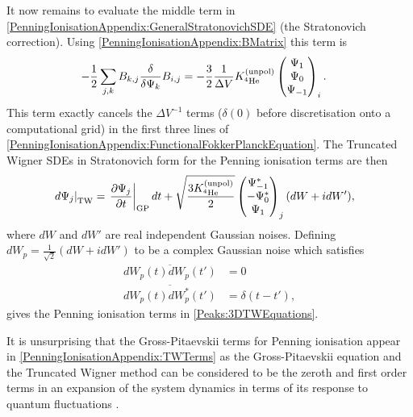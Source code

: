 It now remains to evaluate the middle term in \eqref{PenningIonisationAppendix:GeneralStratonovichSDE} (the Stratonovich correction). Using \eqref{PenningIonisationAppendix:BMatrix} this term is
\begin{align}
    - \frac{1}{2} \sum_{j, k} B_{k, j} \frac{\delta }{\delta \Psi_k}B_{i,j} &= - \frac{3}{2} \frac{1}{\Delta V} K^\text{(unpol)}_{^4\text{He}} 
    \begin{pmatrix}
        \Psi_1 \\
        \Psi_0 \\
        \Psi_{-1}
    \end{pmatrix}_i.
\end{align}
This term exactly cancels the $\Delta V^{-1}$ terms ($\delta(0)$ before discretisation onto a computational grid) in the first three lines of \eqref{PenningIonisationAppendix:FunctionalFokkerPlanckEquation}. The Truncated Wigner SDEs in Stratonovich form for the Penning ionisation terms are then
\begin{align}
    \left. d \Psi_j\right|_\text{TW} &= \left. \frac{\partial \Psi_j}{\partial t}\right|_\text{GP} dt + \sqrt{\frac{3 \Kunpol}{2}} 
    \begin{pmatrix}
        \Psi_{-1}^*\\
        -\Psi_{0}^*\\
        \Psi_{1}
    \end{pmatrix}_j (d W + i dW'),
    \label{PenningIonisationAppendix:TWTerms}
\end{align}
where $dW$ and $dW'$ are real independent Gaussian noises. Defining $ dW_p = \frac{1}{\sqrt{2}}\left(dW + i dW' \right)$ to be a complex Gaussian noise which satisfies
\begin{align}
    \overline{dW_p(t) dW_p(t')} &= 0 \\
    \overline{dW_p(t) dW_p^*(t')} &= \delta(t-t'),
\end{align}
gives the Penning ionisation terms in \eqref{Peaks:3DTWEquations}.

It is unsurprising that the Gross-Pitaevskii terms for Penning ionisation appear in \eqref{PenningIonisationAppendix:TWTerms} as the Gross-Pitaevskii equation and the Truncated Wigner method can be considered to be the zeroth and first order terms in an expansion of the system dynamics in terms of its response to quantum fluctuations \citep{Polkovnikov:2003}.